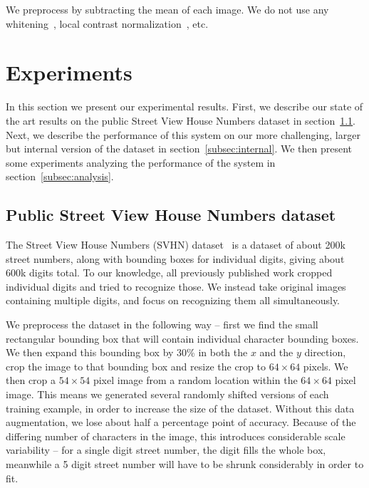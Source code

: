 \documentclass{article} \usepackage{comment}
\begin{document}
We preprocess by subtracting
the mean of each image. We do not use any whitening~\citep{Hyvarinen-2001-small},
local contrast normalization~\citep{sermanet-icpr-12}, etc.

\section{Experiments}
\label{sec:experiments}

In this section we present our experimental results. First, we describe our state of the
art results on the public Street View House Numbers dataset in section~\ref{subsec:public}.
Next, we describe the performance of this system on our more challenging, larger but internal
version of the dataset in section~\ref{subsec:internal}. We then present some experiments
analyzing the performance of the system in section~\ref{subsec:analysis}.

\subsection{Public Street View House Numbers dataset}
\label{subsec:public}

The Street View House Numbers (SVHN) dataset~\citep{Netzer-wkshp-2011} is a dataset of about 200k street numbers, along with bounding boxes for individual digits, giving about 600k digits total. To our knowledge, all previously published work cropped individual digits and tried to recognize those. We instead take original images containing multiple digits, and focus on recognizing them all simultaneously.

We preprocess the dataset in the following way -- first we find the small rectangular bounding box that will contain individual character bounding boxes.
We then expand this bounding box by 30\% in both the $x$ and the $y$ direction, crop the image to that bounding box and resize the crop to $64 \times 64$ pixels. We then crop a $54 \times 54$ pixel image from a
random location within the $64 \times 64$ pixel image. This means we generated several randomly shifted versions
of each training example, in order to increase the size of the dataset. Without this data augmentation, we lose
about half a percentage point of accuracy.
Because of the differing number of characters
in the image, this introduces considerable scale variability -- for a single digit street number, the digit fills the whole box, meanwhile a 5
digit street number will have to be shrunk considerably in order to fit.
\end{document}

